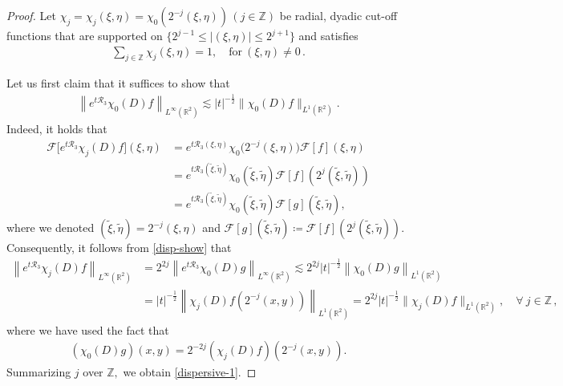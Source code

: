 \documentclass[11pt,reqno]{article}
\numberwithin{equation}{section}
\newcommand \tri {\coloneqq}
\def\cF{{\mathcal F}}
\begin{document}
\begin{appendices}
\begin{proof}
	Let $\chi_j=\chi_j(\xi, \eta)=\chi_0(2^{-j}(\xi, \eta))\, (j\in \mathbb{Z})$ be radial, dyadic cut-off functions that are supported on $\{2^{j-1}\leq |(\xi,\eta)|\leq 2^{j+1}\}$ and satisfies 
	\begin{align*}
		\sum_{j\in \mathbb{Z}}\chi_j(\xi,\eta)=1, \quad \text{for}~(\xi,\eta)\neq 0\,.
	\end{align*}
	
	Let us first claim that it suffices to show that 
	\begin{align}\label{disp-show}
		\left\| e^{t\mathcal{R}_3}\chi_0(D)f \right\|_{L^\infty(\mathbb{R}^2)} \lesssim |t|^{-\frac{1}{2}} \|\chi_0(D)f\|_{L^1(\mathbb{R}^2)}.
	\end{align}
	Indeed, it holds that 
	\begin{align*}
		\cF\big[e^{t\mathcal{R}_3}\chi_j(D)f\big](\xi,\eta)&=e^{t \mathcal{R}_3(\xi,\eta)}\chi_0\big(2^{-j} (\xi,\eta)\big) \cF[f](\xi,\eta) \\
		&= e^{t \mathcal{R}_3(\tilde{\xi},\tilde{\eta})}\chi_0(\tilde{\xi},\tilde{\eta}) \cF[f](2^{j}(\tilde{\xi},\tilde{\eta}))
        \\
        &=e^{t \mathcal{R}_3(\tilde{\xi},\tilde{\eta})}\chi_0(\tilde{\xi},\tilde{\eta}) \cF[g](\tilde{\xi},\tilde{\eta}),
	\end{align*}
	where we denoted $(\tilde{\xi}, \tilde{\eta})=2^{-j}(\xi,\eta)$ and $\cF[g](\tilde{\xi},\tilde{\eta})\tri \cF[f](2^{j}(\tilde{\xi},\tilde{\eta}))$.
	Consequently, it follows from \eqref{disp-show} that
	\begin{align}\label{dispes-pj}
		\left\| e^{t\mathcal{R}_3}\chi_j(D)f \right\|_{L^\infty(\mathbb{R}^2)} 
        &=2^{2j}\left\| e^{t\mathcal{R}_3}\chi_0(D)g \right\|_{L^\infty(\mathbb{R}^2)} 
        \lesssim 2^{2j}|t|^{-\frac{1}{2}} \left\| \chi_0(D)g \right\|_{L^1(\mathbb{R}^2)} 
        \nonumber
        \\
        &=|t|^{-\frac{1}{2}} \left\| \chi_j(D)f(2^{-j}(x,y))\right\|_{L^1(\mathbb{R}^2)} 
        =
        2^{2j}|t|^{-\frac{1}{2}} \|\chi_j(D)f\|_{L^1(\mathbb{R}^2)}, \quad \forall~ j\in \mathbb{Z}\, ,
	\end{align}
    where we have used the fact that
    \begin{align*}
        (\chi_0(D)g) (x,y)=2^{-2j}(\chi_j(D) f)(2^{-j}(x,y)).
    \end{align*}
	Summarizing $j$ over $\mathbb{Z},$ we obtain 
	\eqref{dispersive-1}.
	

\end{proof}
\end{appendices}
\end{document}
